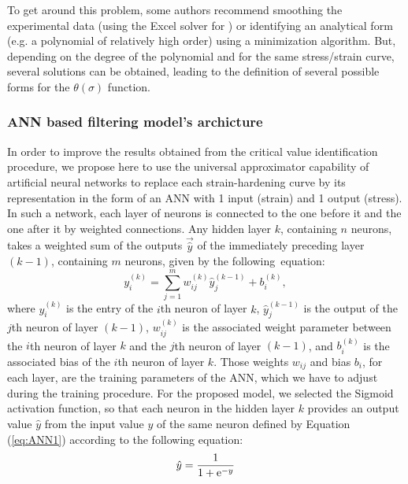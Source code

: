 \documentclass[metals,article,submit,pdftex,moreauthors]{Definitions/mdpi}
\DeclareRobustCommand{\e}[1]{{\rm e}^{#1}}
\DeclareRobustCommand{\lay}[1]{^{(#1)}}
\begin{document}
To get around this problem, some authors recommend smoothing the experimental data (using the Excel solver for \cite{Najafizadeh-2006}) or identifying an analytical form (e.g. a polynomial of relatively high order) using a minimization algorithm.
But, depending on the degree of the polynomial and for the same stress/strain curve, several solutions can be obtained, leading to the definition of several possible forms for the $\theta(\sigma)$ function.

\subsubsection{ANN based filtering model's archicture \label{subsec:ANNbasics}}
In order to improve the results obtained from the critical value identification procedure, we propose here to use the universal approximator capability of artificial neural networks to replace each strain-hardening curve by its representation in the form of an ANN with 1 input (strain) and 1 output (stress).
In such a network, each layer of neurons is connected to the one before it and the one after it by weighted connections.
Any hidden layer $k$, containing $n$ neurons, takes a weighted sum of the outputs $\overrightarrow{\hat{y}}$ of the immediately preceding layer $(k-1)$, containing $m$ neurons, given by the following~equation:
\begin{equation}
y_i\lay{k} = \sum_{j=1}^m w_{ij}\lay{k} \hat{y}_j^{(k-1)}+ b_i\lay{k},\label{eq:ANN1}
\end{equation}
where $y_i\lay{k}$ is the entry of the  $i$th neuron of layer $k$, $\hat{y}_j\lay{k-1}$ is the output of the $j$th neuron of layer $(k-1)$, $w_{ij}\lay{k}$ is the associated weight parameter between the  $i$th neuron of layer $k$ and the  $j$th neuron of layer $(k-1)$, and $b_i\lay{k}$ is the associated bias of the  $i$th neuron of layer $k$.
Those weights $w_{ij}$ and bias $b_i$, for each layer, are the training parameters of the ANN, which we have to adjust during the training procedure.
For the proposed model, we selected the Sigmoid activation function, so that each neuron in the hidden layer $k$ provides an output value ${\hat{y}}$ from the input value $y$ of the same neuron defined by Equation (\ref{eq:ANN1}) according to the following equation:
\begin{equation}
\hat{y}=\frac{1}{1 + \e{-y}}\label{eq:ANN2}
\end{equation}
\end{document}
